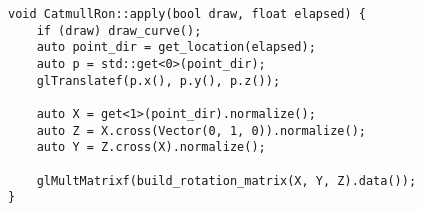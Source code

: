 \begin{lstlisting}
void CatmullRon::apply(bool draw, float elapsed) {
    if (draw) draw_curve();
    auto point_dir = get_location(elapsed);
    auto p = std::get<0>(point_dir);
    glTranslatef(p.x(), p.y(), p.z());

    auto X = get<1>(point_dir).normalize();
    auto Z = X.cross(Vector(0, 1, 0)).normalize();
    auto Y = Z.cross(X).normalize();

    glMultMatrixf(build_rotation_matrix(X, Y, Z).data());
}
\end{lstlisting}
